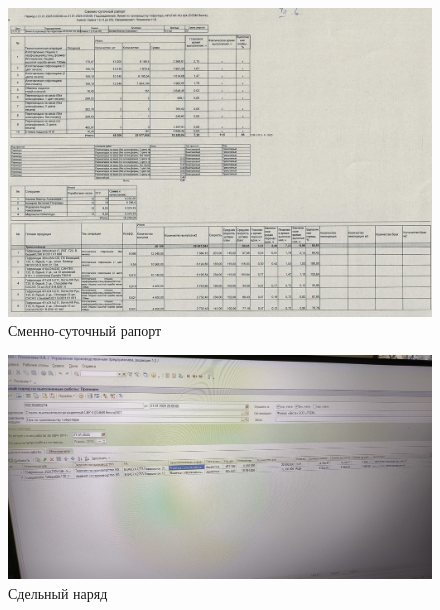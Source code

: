 \begin{figure}
\begin{center}
 \includegraphics[height=0.5\textheight, keepaspectratio]{Pics/III.6.jpg}
\end{center}
 \caption{Сменно-суточный рапорт}
 \label{pic:III.6}
\end{figure}

\begin{figure}
\begin{center}
 \includegraphics[height=0.35\textheight, keepaspectratio]{Pics/IIIсдельныйнаряд.jpg}
\end{center}
 \caption{Сдельный наряд}
 \label{pic:IIIсдельныйнаряд}
\end{figure}

